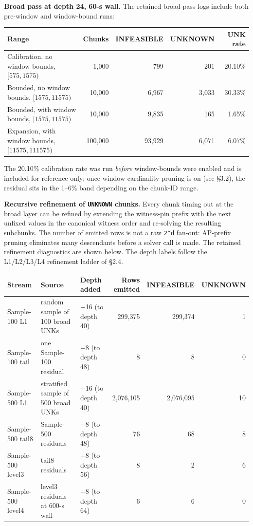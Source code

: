 \textbf{Broad pass at depth 24, 60-s wall.} The retained broad-pass logs include
both pre-window and window-bound runs:

{\def\LTcaptype{none} %
\begin{longtable}[]{@{}
  >{\raggedright\arraybackslash}p{}
  rrrr@{}}
\toprule\noalign{}
Range & Chunks & INFEASIBLE & UNKNOWN & UNK rate \\
\midrule\noalign{}
\endhead
\bottomrule\noalign{}
\endlastfoot
Calibration, no window bounds, $[575, 1575)$ & 1,000 & 799 & 201 & 20.10\% \\
Bounded, no window bounds, $[1575, 11575)$ & 10,000 & 6,967 & 3,033 & 30.33\% \\
Bounded, with window bounds, $[1575, 11575)$ & 10,000 & 9,835 & 165 & 1.65\% \\
Expansion, with window bounds, $[11575, 111575)$ & 100,000 & 93,929 & 6,071 & 6.07\% \\
\end{longtable}
}

The 20.10\% calibration rate was run \emph{before} window-bounds were enabled
and is included for reference only; once window-cardinality pruning is on
(see §3.2), the residual sits in the 1--6\% band depending on the
chunk-ID range.

\textbf{Recursive refinement of \texttt{UNKNOWN} chunks.} Every chunk timing out at
the broad layer can be refined by extending the witness-pin prefix with the
next unfixed values in the canonical witness order and re-solving the
resulting subchunks. The number
of emitted rows is not a raw \texttt{2\^{}d} fan-out: AP-prefix pruning eliminates many
descendants before a solver call is made. The retained refinement diagnostics
are shown below. The depth labels follow the L1/L2/L3/L4 refinement ladder of
§2.4.

{\def\LTcaptype{none} %
\begin{longtable}[]{@{}
  >{\raggedright\arraybackslash}p{}
  >{\raggedright\arraybackslash}p{}
  >{\raggedright\arraybackslash}p{}
  rrr@{}}
\toprule\noalign{}
Stream & Source & Depth added & Rows emitted & INFEASIBLE & UNKNOWN \\
\midrule\noalign{}
\endhead
\bottomrule\noalign{}
\endlastfoot
Sample-100 L1 & random sample of 100 broad UNKs & +16 (to depth 40) & 299,375 & 299,374 & 1 \\
Sample-100 tail & one Sample-100 residual & +8 (to depth 48) & 8 & 8 & 0 \\
Sample-500 L1 & stratified sample of 500 broad UNKs & +16 (to depth 40) & 2,076,105 & 2,076,095 & 10 \\
Sample-500 tail8 & 10 Sample-500 residuals & +8 (to depth 48) & 76 & 68 & 8 \\
Sample-500 level3 & 8 tail8 residuals & +8 (to depth 56) & 8 & 2 & 6 \\
Sample-500 level4 & 6 level3 residuals at 600-s wall & +8 (to depth 64) & 6 & 6 & 0 \\
\end{longtable}
}


